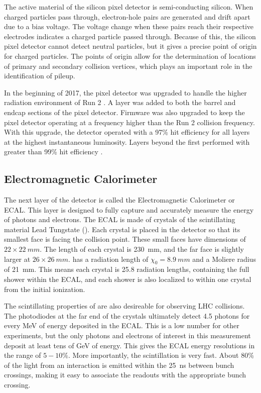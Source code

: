 The active material of the silicon pixel detector is semi-conducting silicon.
When charged particles pass through,
electron-hole pairs are generated and drift apart due to a bias voltage.
The voltage change when these pairs reach their respective electrodes
indicates a charged particle passed through.
Because of this, the silicon pixel detector cannot detect neutral particles,
but it gives a precise point of origin for charged particles.
The points of origin allow for the determination of locations of primary and secondary
collision vertices, which plays an important role in the identification of pileup.

In the beginning of 2017, the pixel detector was upgraded to handle
the higher radiation environment of Run 2 \cite{Dominguez:1481838}.
A layer was added to both the barrel and endcap sections of the pixel detector.
Firmware was also upgraded to keep the pixel detector operating
at a frequency higher than the Run 2 collision frequency.
With this upgrade, the detector operated with a 97\% hit efficiency
for all layers at the highest instantaneous luminosity.
Layers beyond the first performed with greater than 99\% hit efficiency \cite{Modak:2712284}.

\subsection{Electromagnetic Calorimeter} \label{sec:ecal}

The next layer of the detector is called the Electromagnetic Calorimeter or ECAL.
This layer is designed to fully capture and accurately measure
the energy of photons and electrons.
The ECAL is made of crystals of the scintillating material Lead Tungstate ().
Each crystal is placed in the detector so that its smallest face
is facing the collision point.
These small faces have dimensions of $22\times\SI{22}{mm}$.
The length of each crystal is \SI{230}{mm},
and the far face is slightly larger at $26\times\SI{26}{mm}$.
 has a radiation length of $\chi_0 = \SI{8.9}{mm}$ and
a Moliere radius of \SI{21}{mm}.
This means each crystal is 25.8 radiation lengths,
containing the full shower within the ECAL,
and each shower is also localized to within one crystal from the initial ionization.

The scintillating properties of  are also desireable for observing LHC collisions.
The photodiodes at the far end of the crystals
ultimately detect 4.5 photons for every MeV of energy deposited in the ECAL.
This is a low number for other experiments, but the only photons and electrons of
interest in this measurement deposit at least tens of GeV of energy.
This gives the ECAL energy resolutions in the range of $5-10\%$.
More importantly, the scintillation is very fast.
About 80\% of the light from an interaction is emitted within
the \SI{25}{ns} between bunch crossings,
making it easy to associate the readouts with the appropriate bunch crossing.

